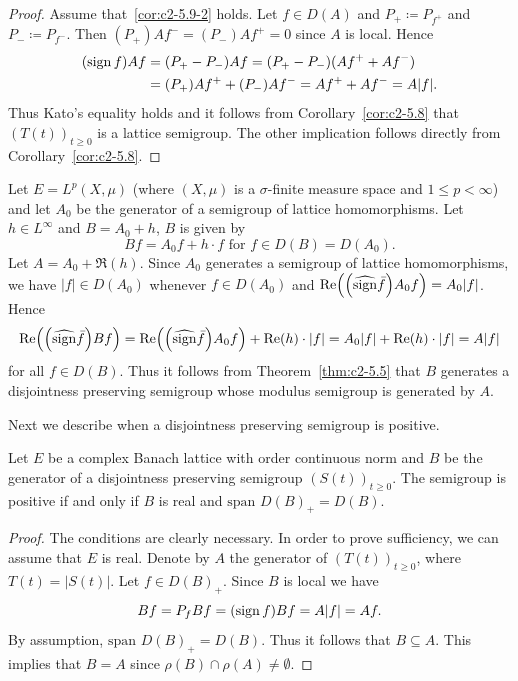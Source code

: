 \begin{proof}
Assume that~\ref{cor:c2-5.9-2}   holds. 
Let $f \in D(A)$ and $P_{+} \coloneq P_{f^{+}}$ and $P_{-} \coloneq P_{f^{-}}$.
Then 
$(P_{+})Af^{-} = (P_{-})Af^{+} = 0$ since $A$ is local. 
Hence 
\begin{equation*}
    \begin{split}
    (\operatorname{sign}  f)Af &= (P_{+} - P_{-})Af = (P_{+} - P_{-})(Af^{+} + Af^{-})\\ 
    &= (P_{+})Af^{+} + (P_{-})Af^{-} = Af^{+} + Af^{-} = A|f| .
    \end{split}
\end{equation*}
Thus Kato's equality holds and it follows from Corollary~\ref{cor:c2-5.8}   that $(T(t))_{t \geq 0}$ is a lattice semigroup. The other implication follows directly from Corollary~\ref{cor:c2-5.8}.
\end{proof}
\begin{example}\label{ex:c2-5.10}
Let $E = L^{p}(X,\mu)$ (where $(X,\mu)$ is a $\sigma$-finite measure space and $1 \leq p < \infty$) and let $A_{0}$ be the generator of a semigroup of lattice homomorphisms. 
Let $h \in L^{\infty}$ and $B = A_{0} + h$, \ie $B$ is given by 
\[
Bf = A_{0}f + h \cdot f  \text{ for } f \in D(B) = D(A_{0}) . 
\]
Let $A = A_{0} + \Re(h)$.
Since $A_{0}$ generates a semigroup of lattice homomorphisms, we have $|f| \in D(A_{0})$ whenever $f \in D(A_{0})$ and $\Re\mleft(\mleft( \widehat{\sign} \bar{f}\mright)A_{0}f\mright) = A_{0}|f|$.
Hence 
\[\Re\mleft(\mleft(\widehat{\sign}  \bar{f}\mright)Bf\mright) = \Re\mleft(\mleft(\widehat{\sign}  \bar{f}\mright)A_{0}f\mright) + \Re(h) \cdot |f| = A_{0}|f| + \Re(h) \cdot |f| = A|f|
\]
for all $f \in D(B)$. 
Thus it follows from Theorem~\ref{thm:c2-5.5}   that $B$ generates a disjointness preserving semigroup whose modulus semigroup is generated by $A$.
\end{example}
Next we describe when a disjointness preserving semigroup is positive.
\begin{proposition}\label{prop:c2-5.11}
%
Let $E$ be a complex Banach lattice with order continuous norm and $B$ be the generator of a disjointness preserving semigroup $(S(t))_{t \geq 0}$. 
The semigroup is positive if and only if\/ $B$ is real and $\text{span } D(B)_{+} = D(B)$.
\end{proposition}
\begin{proof}
The conditions are clearly necessary. 
In order to prove sufficiency, we can assume that $E$ is real. 
Denote by $A$ the generator of\/ $(T(t))_{t \geq 0}$, where $T(t) = |S(t)|$. 
Let $f \in D(B)_{+}$. 
Since $B$ is local we have 
\[
Bf = P_{f}Bf = (\operatorname{sign}  f)Bf = A|f| = Af .
\]
By assumption, $\text{span } D(B)_{+} = D(B)$. 
Thus it follows that $B \subseteq A$. 
This implies that $B = A$ since $\rho(B) \cap \rho(A) \neq \emptyset$.
\end{proof}
